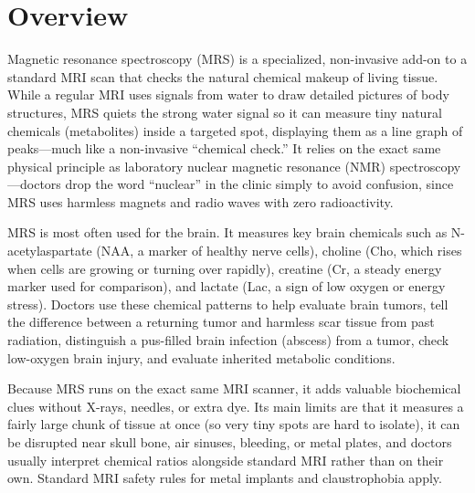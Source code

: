 \label{ch:infographic-mrs}

\section{Overview}

Magnetic resonance spectroscopy (MRS) is a specialized, non-invasive add-on to a standard MRI scan that checks the natural chemical makeup of living tissue. While a regular MRI uses signals from water to draw detailed pictures of body structures, MRS quiets the strong water signal so it can measure tiny natural chemicals (metabolites) inside a targeted spot, displaying them as a line graph of peaks---much like a non-invasive ``chemical check.'' It relies on the exact same physical principle as laboratory nuclear magnetic resonance (NMR) spectroscopy---doctors drop the word ``nuclear'' in the clinic simply to avoid confusion, since MRS uses harmless magnets and radio waves with zero radioactivity.

MRS is most often used for the brain. It measures key brain chemicals such as N-acetylaspartate (NAA, a marker of healthy nerve cells), choline (Cho, which rises when cells are growing or turning over rapidly), creatine (Cr, a steady energy marker used for comparison), and lactate (Lac, a sign of low oxygen or energy stress). Doctors use these chemical patterns to help evaluate brain tumors, tell the difference between a returning tumor and harmless scar tissue from past radiation, distinguish a pus-filled brain infection (abscess) from a tumor, check low-oxygen brain injury, and evaluate inherited metabolic conditions.

Because MRS runs on the exact same MRI scanner, it adds valuable biochemical clues without X-rays, needles, or extra dye. Its main limits are that it measures a fairly large chunk of tissue at once (so very tiny spots are hard to isolate), it can be disrupted near skull bone, air sinuses, bleeding, or metal plates, and doctors usually interpret chemical ratios alongside standard MRI rather than on their own. Standard MRI safety rules for metal implants and claustrophobia apply.

